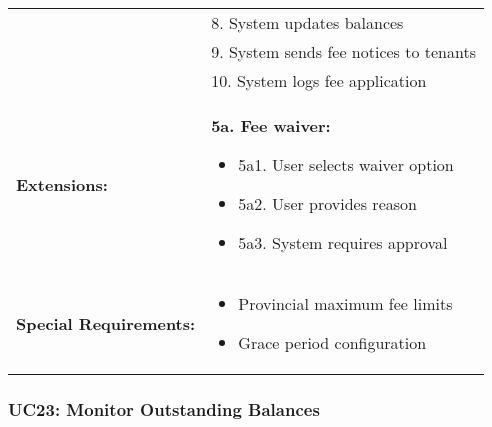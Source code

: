 \documentclass[12pt]{article}
\begin{document}
\begin{longtable}{|p{3cm}|p{11cm}|}
& 8. System updates balances \\
& 9. System sends fee notices to tenants \\
& 10. System logs fee application \\
\hline
\textbf{Extensions:} & 
\textbf{5a. Fee waiver:}
\begin{itemize}
    \item 5a1. User selects waiver option
    \item 5a2. User provides reason
    \item 5a3. System requires approval
\end{itemize} \\
\hline
\textbf{Special Requirements:} & 
\begin{itemize}
    \item Provincial maximum fee limits
    \item Grace period configuration
\end{itemize} \\
\hline
\end{longtable}

\subsubsection{UC23: Monitor Outstanding Balances}
\end{document}

